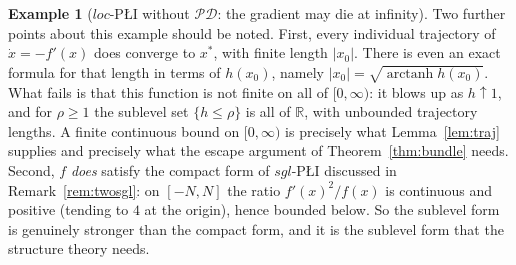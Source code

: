 \documentclass[11pt]{article}
\theoremstyle{plain}
\theoremstyle{definition}
\newtheorem{ex}[thm]{Example}
\theoremstyle{remark}
\newcommand{\R}{\mathbb{R}}
\begin{document}
\begin{ex}[$loc$-P\L{}I without $\mathcal{PD}$: the gradient may die at infinity]
Two further points about this example should be noted. First, every individual
trajectory of $\dot x = -f'(x)$ does converge to $x^*$, with finite length
$|x_0|$. There is even an exact formula for that length in terms of $h(x_0)$,
namely $|x_0| = \sqrt{\operatorname{arctanh} h(x_0)}$. What fails is that this
function is not finite on all of $[0,\infty)$: it blows up as $h\uparrow1$, and for
$\rho\ge1$ the sublevel set $\{h\le\rho\}$ is all of $\R$, with unbounded
trajectory lengths. A finite continuous bound on $[0,\infty)$ is precisely what
Lemma~\ref{lem:traj} supplies and precisely what the escape argument of
Theorem~\ref{thm:bundle} needs. Second, $f$ \emph{does} satisfy
the compact form of $sgl$-P\L{}I discussed in Remark~\ref{rem:twosgl}: on
$[-N,N]$ the ratio $f'(x)^2/f(x)$ is continuous and positive (tending to $4$ at
the origin), hence bounded below. So the sublevel form is genuinely stronger than
the compact form, and it is the sublevel form that the structure theory needs.
\end{ex}
\end{document}
